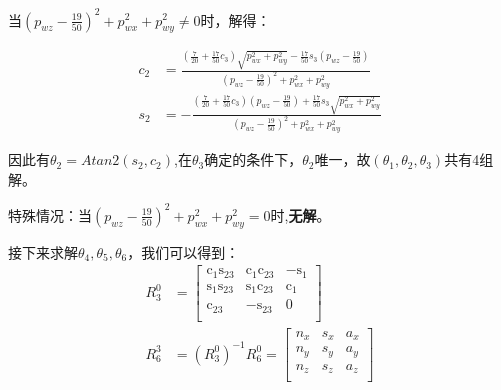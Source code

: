     当$\left( p_{wz}-\frac{19}{50} \right) ^2+p_{wx}^{2}+p_{wy}^{2}\neq 0$时，解得：

    \begin{equation}
        \begin{aligned}
            c_2 &=\frac{\left( \frac{7}{20}+\frac{17}{50}c_3 \right) \sqrt{p_{wx}^{2}+p_{wy}^{2}}-\frac{17}{50}s_3\left( p_{wz}-\frac{19}{50} \right)}{\left( p_{wz}-\frac{19}{50} \right) ^2+p_{wx}^{2}+p_{wy}^{2}}\\
            s_2 &=-\frac{\left( \frac{7}{20}+\frac{17}{50}c_3 \right) \left( p_{wz}-\frac{19}{50} \right) +\frac{17}{50}s_3\sqrt{p_{wx}^{2}+p_{wy}^{2}}}{\left( p_{wz}-\frac{19}{50} \right) ^2+p_{wx}^{2}+p_{wy}^{2}}
        \end{aligned}
    \end{equation}

    因此有$\theta_2 = Atan2(s_2,c_2)$,在$\theta_3$确定的条件下，$\theta_2$唯一，故$(\theta_1,\theta_2,\theta_3)$共有4组解。

    \textcolor{cherry}{特殊情况：}当$\left( p_{wz}-\frac{19}{50} \right) ^2+p_{wx}^{2}+p_{wy}^{2} = 0$时,\textbf{无解}。

接下来求解$\theta_4,\theta_5,\theta_6$，我们可以得到：
\begin{equation}
    \begin{aligned}
        R_{3}^{0}&=\left[ \begin{matrix}	\mathrm{c}_1\mathrm{s}_{23}&		\mathrm{c}_1\mathrm{c}_{23}&		-\mathrm{s}_1\\	\mathrm{s}_1\mathrm{s}_{23}&		\mathrm{s}_1\mathrm{c}_{23}&		\mathrm{c}_1\\	\mathrm{c}_{23}&		-\mathrm{s}_{23}&		0\\\end{matrix} \right] \\
        R_{6}^{3}&=\left( R_{3}^{0} \right) ^{-1}R_{6}^{0}=\left[ \begin{matrix}	n_x&		s_x&		a_x\\	n_y&		s_y&		a_y\\	n_z&		s_z&		a_z\\\end{matrix} \right] 
    \end{aligned}
\end{equation}

